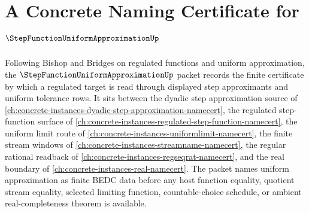 \chapter{A Concrete Naming Certificate for $\StepFunctionUniformApproximationUp$}
\label{ch:concrete-instances-step-function-uniform-approximation-namecert}

Following Bishop and Bridges on regulated functions and uniform approximation, the $\StepFunctionUniformApproximationUp$ packet records the finite certificate by which a regulated target is read through displayed step approximants and uniform tolerance rows. It sits between the dyadic step approximation source of \autoref{ch:concrete-instances-dyadic-step-approximation-namecert}, the regulated step-function surface of \autoref{ch:concrete-instances-regulated-step-function-namecert}, the uniform limit route of \autoref{ch:concrete-instances-uniformlimit-namecert}, the finite stream windows of \autoref{ch:concrete-instances-streamname-namecert}, the regular rational readback of \autoref{ch:concrete-instances-regseqrat-namecert}, and the real boundary of \autoref{ch:concrete-instances-real-namecert}. The packet names uniform approximation as finite BEDC data before any host function equality, quotient stream equality, selected limiting function, countable-choice schedule, or ambient real-completeness theorem is available.


